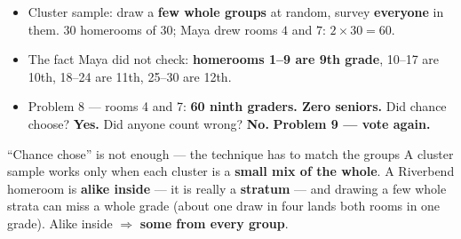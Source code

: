\documentclass[aspectratio=169, 11pt]{beamer}
\newcommand{\redink}[1]{{\color{redacc}\bfseries #1}}
\begin{document}
\begin{frame}[t, plain]
  \vspace{2pt}
  \begin{itemize}\setlength{\itemsep}{4pt}
    \item Cluster sample: draw a \textbf{few whole groups} at random, survey \textbf{everyone}
          in them. $30$ homerooms of $30$; Maya drew rooms $4$ and $7$: $2 \times 30 = 60$.
    \item The fact Maya did not check: \textbf{homerooms 1--9 are 9th grade}, 10--17 are 10th,
          18--24 are 11th, 25--30 are 12th.
    \item Problem 8 --- rooms 4 and 7: \redink{60 ninth graders. Zero seniors.} Did chance
          choose? \textbf{Yes.} Did anyone count wrong? \textbf{No.}
          \textbf{Problem 9 --- vote again.}
  \end{itemize}
  \begin{block}{``Chance chose'' is not enough --- the technique has to match the groups}
    A cluster sample works only when each cluster is a \textbf{small mix of the whole}. A
    Riverbend homeroom is \textbf{alike inside} --- it is really a \textbf{stratum} --- and
    drawing a few whole strata can miss a whole grade (about one draw in four lands both rooms
    in one grade). Alike inside $\Rightarrow$ \redink{some from every group}.
  \end{block}
\end{frame}
\end{document}
